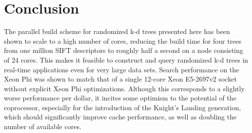 \section{Conclusion}
\label{sec:conclusion}


The parallel build scheme for randomized k-d trees presented here has been shown to scale to a high number of cores, reducing the build time for four trees from one million SIFT descriptors to roughly half a second on a node consisting of 24 cores. This makes it feasible to construct and query randomized k-d trees in real-time applications even for very large data sets. Search performance on the Xeon Phi was shown to match that of a single 12-core Xeon E5-2697v2 socket
without explicit Xeon Phi optimizations. Although this corresponds to a slightly worse performance per dollar, it incites some optimism to the potential of the coprocessor, especially for the introduction of the Knight's Landing generation, which should significantly improve cache performance, as well as doubling the number of available cores. 


